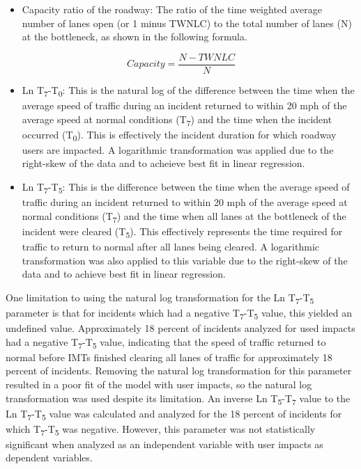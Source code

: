 \documentclass[
  letterpaper,
  authoryear]{elsarticle}
\providecommand{\tightlist}{%
  \setlength{\itemsep}{0pt}\setlength{\parskip}{0pt}}\usepackage{longtable,booktabs,array}
\begin{document}
\begin{itemize}
\tightlist
\item
  Capacity ratio of the roadway: The ratio of the time weighted average
  number of lanes open (or 1 minus TWNLC) to the total number of lanes
  (N) at the bottleneck, as shown in the following formula.
\end{itemize}

\[ Capacity = \frac{N-TWNLC}{N}
\]

\begin{itemize}
\item
  Ln T\textsubscript{7}-T\textsubscript{0}: This is the natural log of
  the difference between the time when the average speed of traffic
  during an incident returned to within 20 mph of the average speed at
  normal conditions (T\textsubscript{7}) and the time when the incident
  occurred (T\textsubscript{0}). This is effectively the incident
  duration for which roadway users are impacted. A logarithmic
  transformation was applied due to the right-skew of the data and to
  acheieve best fit in linear regression.
\item
  Ln T\textsubscript{7}-T\textsubscript{5}: This is the difference
  between the time when the average speed of traffic during an incident
  returned to within 20 mph of the average speed at normal conditions
  (T\textsubscript{7}) and the time when all lanes at the bottleneck of
  the incident were cleared (T\textsubscript{5}). This effectively
  represents the time required for traffic to return to normal after all
  lanes being cleared. A logarithmic transformation was also applied to
  this variable due to the right-skew of the data and to achieve best
  fit in linear regression.
\end{itemize}

One limitation to using the natural log transformation for the Ln
T\textsubscript{7}-T\textsubscript{5} parameter is that for incidents
which had a negative T\textsubscript{7}-T\textsubscript{5} value, this
yielded an undefined value. Approximately 18 percent of incidents
analyzed for used impacts had a negative
T\textsubscript{7}-T\textsubscript{5} value, indicating that the speed
of traffic returned to normal before IMTs finished clearing all lanes of
traffic for approximately 18 percent of incidents. Removing the natural
log transformation for this parameter resulted in a poor fit of the
model with user impacts, so the natural log transformation was used
despite its limitation. An inverse Ln
T\textsubscript{5}-T\textsubscript{7} value to the Ln
T\textsubscript{7}-T\textsubscript{5} value was calculated and analyzed
for the 18 percent of incidents for which
T\textsubscript{7}-T\textsubscript{5} was negative. However, this
parameter was not statistically significant when analyzed as an
independent variable with user impacts as dependent variables.
\end{document}
